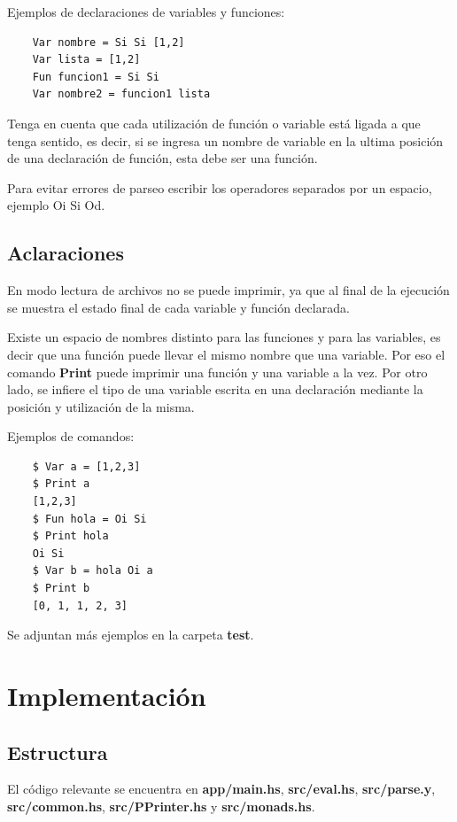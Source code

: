 \documentclass[a4paper,13pt,proof]{article}
\theoremstyle{mytheor}
\begin{document}
Ejemplos de declaraciones de variables y funciones:

\begin{verbatim}
    Var nombre = Si Si [1,2]
    Var lista = [1,2]
    Fun funcion1 = Si Si
    Var nombre2 = funcion1 lista
\end{verbatim}

Tenga en cuenta que cada utilización de función o variable está ligada a que tenga sentido, es decir, si se ingresa un nombre de variable en la ultima posición de una declaración de función, esta debe ser una función.

Para evitar errores de parseo escribir los operadores separados por un espacio, ejemplo Oi Si Od.

\subsection{Aclaraciones}

En modo lectura de archivos no se puede imprimir, ya que al final de la ejecución se muestra el estado final de cada variable y función declarada.

Existe un espacio de nombres distinto para las funciones y para las variables, es decir que una función puede llevar el mismo nombre que una variable. Por eso el comando \textbf{Print} puede imprimir una función y una variable a la vez. Por otro lado, se infiere el tipo de una variable escrita en una declaración mediante la posición y utilización de la misma.

Ejemplos de comandos:

\begin{verbatim}
    $ Var a = [1,2,3]
    $ Print a
    [1,2,3]
    $ Fun hola = Oi Si
    $ Print hola
    Oi Si
    $ Var b = hola Oi a
    $ Print b
    [0, 1, 1, 2, 3]
\end{verbatim}

Se adjuntan más ejemplos en la carpeta \textbf{test}.


\section{Implementación}

\subsection{Estructura}

El código relevante se encuentra en \textbf{app/main.hs}, \textbf{src/eval.hs}, \textbf{src/parse.y}, \textbf{src/common.hs}, \textbf{src/PPrinter.hs} y \textbf{src/monads.hs}.
\end{document}

